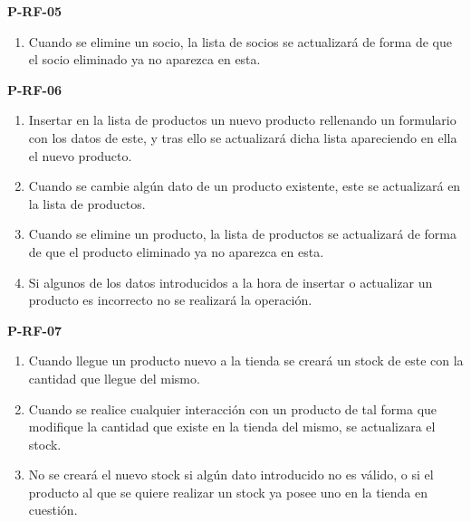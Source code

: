 \textbf{P-RF-05}
\begin{enumerate}
	\item Cuando se elimine un socio, la lista de socios se actualizará de forma de que el socio eliminado ya no aparezca en esta.
\end{enumerate}

\textbf{P-RF-06}
\begin{enumerate}
	\item Insertar en la lista de productos un nuevo producto rellenando un formulario con los datos de este, y tras ello se actualizará dicha lista apareciendo en ella el nuevo producto.
	\item Cuando se cambie algún dato de un producto existente, este se actualizará en la lista de productos.
	\item Cuando se elimine un producto, la lista de productos se actualizará de forma de que el producto eliminado ya no aparezca en esta.
	\item Si algunos de los datos introducidos a la hora de insertar o actualizar un producto es incorrecto no se realizará la operación.
\end{enumerate}

\textbf{P-RF-07}
\begin{enumerate}
	\item Cuando llegue un producto nuevo a la tienda se creará un stock de este con la cantidad que llegue del mismo.
	\item Cuando se realice cualquier interacción con un producto de tal forma que modifique la cantidad que existe en la tienda del mismo, se actualizara el stock.
	\item No se creará el nuevo stock si algún dato introducido no es válido, o si el producto al que se quiere realizar un stock ya posee uno en la tienda en cuestión.
\end{enumerate}


